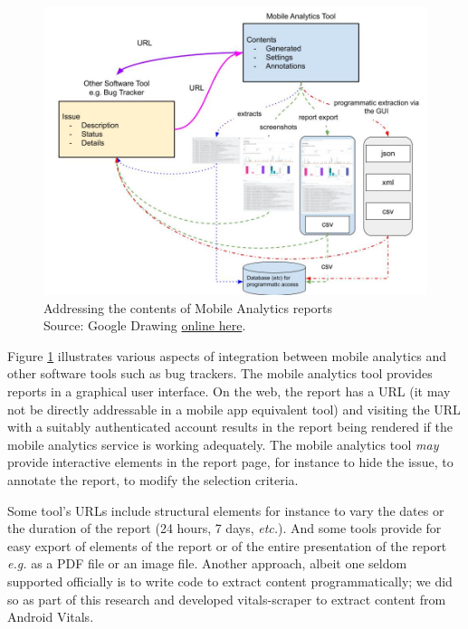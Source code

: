 \begin{figure}
    \centering
    \includegraphics[width=\linewidth]{images/rough-sketches/integration-of-mobile-analytics-tool.jpeg}
    \caption[Addressing the contents of Mobile Analytics reports]{Addressing the contents of Mobile Analytics reports\\Source: Google Drawing \href{https://docs.google.com/drawings/d/1y7QP8UK7ugl0DzWIeH4udRxwsVMHjyQ6Am0qW6glkdE/edit?usp=sharing}{online here}.}
    \label{fig:addressing-the-contents-of-mobile-analytics}
\end{figure}

Figure \ref{fig:addressing-the-contents-of-mobile-analytics} illustrates various aspects of integration between mobile analytics and other software tools such as bug trackers. The mobile analytics tool provides reports in a graphical user interface. On the web, the report has a URL (it may not be directly addressable in a mobile app equivalent tool) and visiting the URL with a suitably authenticated account results in the report being rendered if the mobile analytics service is working adequately. The mobile analytics tool \emph{may} provide interactive elements in the report page, for instance to hide the issue, to annotate the report, to modify the selection criteria. 

Some tool's URLs include structural elements for instance to vary the dates or the duration of the report (24 hours, 7 days, \emph{etc.}). And some tools provide for easy export of elements of the report or of the entire presentation of the report \emph{e.g.} as a PDF file or an image file. Another approach, albeit one seldom supported officially is to write code to extract content programmatically; we did so as part of this research and developed vitals-scraper to extract content from Android Vitals.

